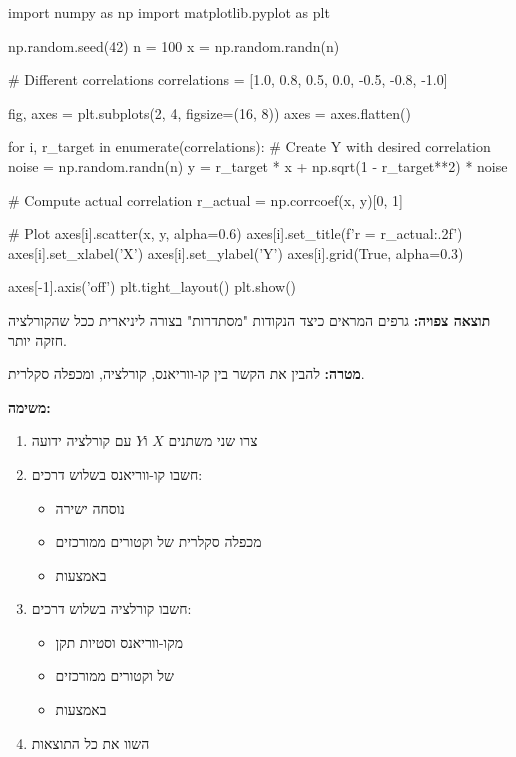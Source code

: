 \begin{pythonbox}
import numpy as np
import matplotlib.pyplot as plt

np.random.seed(42)
n = 100
x = np.random.randn(n)

# Different correlations
correlations = [1.0, 0.8, 0.5, 0.0, -0.5, -0.8, -1.0]

fig, axes = plt.subplots(2, 4, figsize=(16, 8))
axes = axes.flatten()

for i, r_target in enumerate(correlations):
    # Create Y with desired correlation
    noise = np.random.randn(n)
    y = r_target * x + np.sqrt(1 - r_target**2) * noise
    
    # Compute actual correlation
    r_actual = np.corrcoef(x, y)[0, 1]
    
    # Plot
    axes[i].scatter(x, y, alpha=0.6)
    axes[i].set_title(f'r = {r_actual:.2f}')
    axes[i].set_xlabel('X')
    axes[i].set_ylabel('Y')
    axes[i].grid(True, alpha=0.3)

axes[-1].axis('off')
plt.tight_layout()
plt.show()
\end{pythonbox}

\textbf{תוצאה צפויה:} גרפים המראים כיצד הנקודות "מסתדרות" בצורה ליניארית ככל שהקורלציה חזקה יותר.


\textbf{מטרה:} להבין את הקשר בין קו-ווריאנס, קורלציה, ומכפלה סקלרית.

\textbf{משימה:}

\begin{enumerate}
\item צרו שני משתנים $X$ ו\en{-}$Y$ עם קורלציה ידועה
\item חשבו קו-ווריאנס בשלוש דרכים:
\begin{itemize}
\item נוסחה ישירה
\item מכפלה סקלרית של וקטורים ממורכזים
\item באמצעות 
\end{itemize}
\item חשבו קורלציה בשלוש דרכים:
\begin{itemize}
\item מקו-ווריאנס וסטיות תקן
\item {} של וקטורים ממורכזים
\item באמצעות 
\end{itemize}
\item השוו את כל התוצאות
\end{enumerate}

